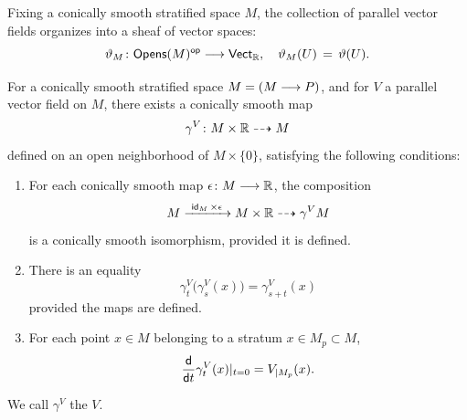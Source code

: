 \begin{remark}
    Fixing a conically smooth stratified space $M$, the collection of parallel vector fields organizes into a sheaf of vector spaces:
    \begin{equation}
        \vartheta_{M} \colon \mathsf{Opens}(M)^{\mathsf{op}} \longrightarrow \mathsf{Vect}_{\mathbb R}, \quad \vartheta_M(U) \, = \, \vartheta(U).
    \end{equation} 
\end{remark}


\begin{proposition}[Flows]\cite[Lemma~8.1.3]{AFT1}\label{ch4:: def:flows}
For a conically smooth stratified space $M = (M \longrightarrow P)$, and for $V$ a parallel vector field on $M$, there exists a conically smooth map 
\begin{equation}\label{eq:def:flows}
    \gamma^V \colon M \times \mathbb R \dashrightarrow M
\end{equation}
defined on an open neighborhood of $M\times \{0\}$, satisfying the following conditions:
\begin{enumerate}
    \item For each conically smooth map $\epsilon \colon M \longrightarrow \mathbb R$, the composition 
    \begin{equation}\label{eq:def:flows:iso}
        M \xrightarrow{~ \operatorname{\sf id}_M \times \epsilon ~} M \times \mathbb R \dashrightarrow{\gamma^V} M
    \end{equation}
    is a conically smooth isomorphism, provided it is defined. 
    \item \label{additivity for flow} There is an equality 
    \begin{equation}\label{eq:def:flows:action}
        \gamma^V_{t}\big(\gamma^V_{s}(x)\big) = \gamma^V_{s+t}(x)
    \end{equation}
    provided the maps are defined.
    \item For each point $x\in M$ belonging to a stratum $x\in M_p \subset M$,
    \begin{equation}\label{eq:def:flows:tangent}
        \frac{\sf d}{{\sf d}t}\gamma_t^{V}(x)|_{t=0} = V_{|M_p}(x).
    \end{equation}
\end{enumerate}
We call $\gamma^V$ the $V$.
\end{proposition}

